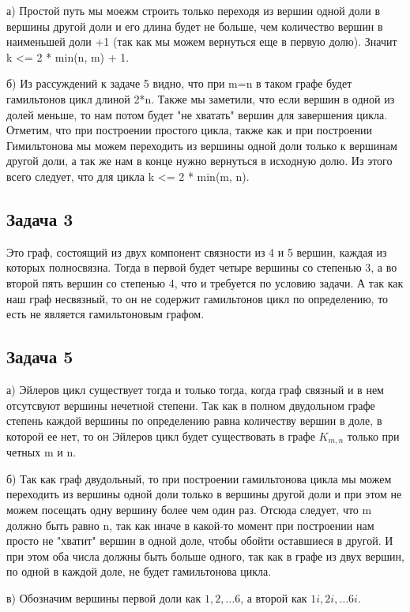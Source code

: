 	а) Простой путь мы моежм строить только переходя из вершин одной доли в вершины другой доли и его длина будет  не больше, чем количество вершин в наименьшей доли +1 (так как мы можем вернуться еще в первую долю). Значит k <= 2 * min(n, m) + 1.
	
	б) Из рассуждений к задаче 5 видно, что при m=n в таком графе будет гамильтонов цикл длиной 2*n. Также мы заметили, что если вершин в одной из долей меньше, то нам потом будет "не хватать" вершин для завершения цикла. Отметим, что при построении простого цикла, также как и при построении Гимильтонова мы можем переходить из вершины одной доли только к вершинам другой доли, а так же нам в конце нужно вернуться в исходную долю. Из этого всего следует, что для цикла k <= 2 * min(m, n).  	
	 
	\subsection{Задача 3}
	Это граф, состоящий из двух компонент связности из 4 и 5 вершин, каждая из которых полносвязна. Тогда в первой будет четыре вершины со степенью 3, а во второй пять вершин со степенью 4, что и требуется по условию задачи. А так как наш граф несвязный, то он не содержит гамильтонов цикл по определению, то есть не является гамильтоновым графом.
	
	\subsection{Задача 5}
	а) Эйлеров цикл существует тогда и только тогда, когда граф связный и в нем отсутсвуют вершины нечетной степени. Так как в полном двудольном графе степень каждой вершины по определению равна количеству вершин в доле, в которой ее нет, то он Эйлеров цикл будет существовать в графе $K_{m,n}$ только при четных m и n.
	
	б) Так как граф двудольный, то при построении гамильтонова цикла мы можем переходить из вершины одной доли только  в вершины другой доли и при этом не можем посещать одну вершину более чем один раз. Отсюда следует, что m должно быть равно n, так как иначе в какой-то момент при построении нам просто не "хватит" вершин в одной доле, чтобы обойти оставшиеся в другой. И при этом оба числа должны быть больше одного, так как в графе из двух вершин, по одной в каждой доле, не будет гамильтонова цикла.
	
	в) Обозначим вершины первой доли как $1, 2, \dots 6$, а второй как $1i, 2i, \dots 6i$. 
	
